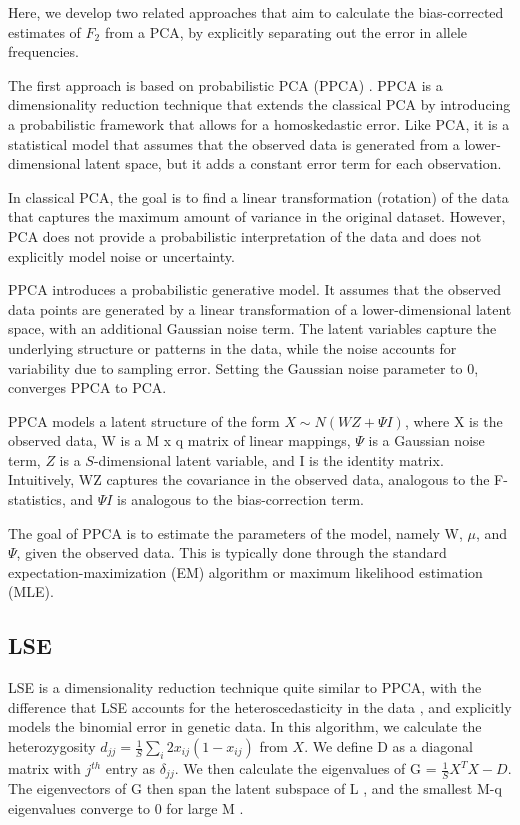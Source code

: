 \documentclass[12pt, letterpaper]{article}
\begin{document}
Here, we develop two related approaches that aim to calculate the bias-corrected estimates of $F_2$ from a PCA, by explicitly separating out the error in allele frequencies.

The first approach is based on probabilistic PCA (PPCA) \cite{tipping_probabilistic_nodate, agrawal_scalable_2020}.
PPCA is a dimensionality reduction technique that extends the classical PCA by introducing a probabilistic framework that allows for a homoskedastic error. Like PCA, it is a statistical model that assumes that the observed data is generated from a lower-dimensional latent space, but it adds a constant error term for each observation.

In classical PCA, the goal is to find a linear transformation (rotation) of the data that captures the maximum amount of variance in the original dataset. However, PCA does not provide a probabilistic interpretation of the data and does not explicitly model noise or uncertainty.

PPCA introduces a probabilistic generative model. It assumes that the observed data points are generated by a linear transformation of a lower-dimensional latent space, with an additional Gaussian noise term. The latent variables capture the underlying structure or patterns in the data, while the noise accounts for variability due to sampling error. Setting the Gaussian noise parameter to 0, converges PPCA to PCA.

PPCA models a latent structure of the form $X \sim N(WZ + \Psi I)$, where X is the observed data, W is a M x q matrix of linear mappings, $\Psi$ is a Gaussian noise term, $Z$ is a $S$-dimensional latent variable, and I is the identity matrix. Intuitively, WZ captures the covariance in the observed data, analogous to the F-statistics, and $\Psi I$ is analogous to the bias-correction term.

The goal of PPCA is to estimate the parameters of the model, namely W, $\mu$, and $\Psi$, given the observed data. This is typically done through the standard expectation-maximization (EM) algorithm or maximum likelihood estimation (MLE).

\subsection{LSE}

LSE is a dimensionality reduction technique quite similar to PPCA, with the difference that LSE accounts for the heteroscedasticity in the data \cite{chen_consistent_2015}, and explicitly models the binomial error in genetic data. In this algorithm, we calculate the heterozygosity  $d_{jj} = \frac{1}{S}\sum_i 2x_{ij}(1- x_{ij})$ from $X$. We define D as a diagonal matrix with $j^{th}$ entry as $\delta_{jj}$. We then calculate the eigenvalues of G = $\frac{1}{S}X^TX - D$. The eigenvectors of G then span the latent subspace of L , and the smallest M-q eigenvalues converge to 0 for large M \cite{cabreros_likelihood-free_2019}.
\end{document}
